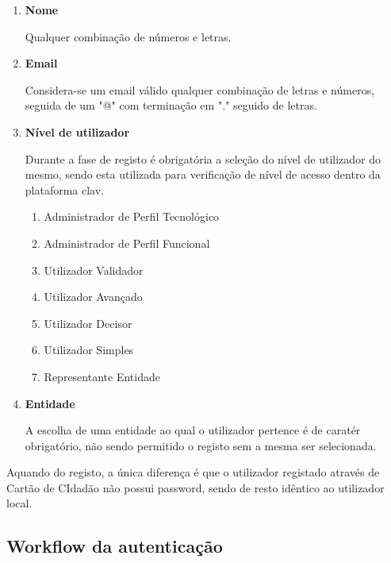 \begin{enumerate}
    \item \textbf{Nome}
    
        Qualquer combinação de números e letras.
    \item \textbf{Email}
    
        Considera-se um email válido qualquer combinação de letras e números, seguida de um "@" com terminação em "." seguido de letras.
    \item \textbf{Nível de utilizador}
    
        Durante a fase de registo é obrigatória a seleção do nível de utilizador do mesmo, sendo esta utilizada para verificação de nível de acesso dentro da plataforma \gls{clav}.
    \begin{enumerate}
        \item Administrador de Perfil Tecnológico
        \item Administrador de Perfil Funcional
        \item Utilizador Validador
        \item Utilizador Avançado
        \item Utilizador Decisor
        \item Utilizador Simples
        \item Representante Entidade
    \end{enumerate}
    \item \textbf{Entidade}
    
        A escolha de uma entidade ao qual o utilizador pertence é de caratér obrigatório, não sendo permitido o registo sem a mesma ser selecionada.
\end{enumerate}

Aquando do registo, a única diferença é que o utilizador registado através de Cartão de CIdadão não possui password, sendo de resto idêntico ao utilizador local.

\cleardoublepage
\subsection{Workflow da autenticação}

